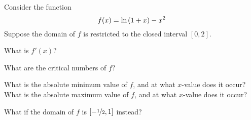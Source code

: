 
Consider the function
\begin{equation*}
 f(x) = \mathrm{ln}\hspace{-0.1ex}\left(1 + x\right) - x^2
\end{equation*}
Suppose the domain of $f$ is restricted to the closed interval $[0,2]$.

\begin{ProblemSet}[pencil space=2in]
 \begin{Problem}
  What is $f'(x)$?
 \end{Problem}
 \begin{Problem}
  What are the critical numbers of $f$?
 \end{Problem}
 \begin{Problem}[pencil space=1.25in]
  What is the absolute minimum value of $f$, and at what $x$-value does it occur?
  What is the absolute maximum value of $f$, and at what $x$-value does it occur?
 \end{Problem}
 \begin{Problem}[pencil space=1.25in]
  What if the domain of $f$ is $[-\nicefrac{1}{2},1]$ instead?
 \end{Problem}
\end{ProblemSet}

